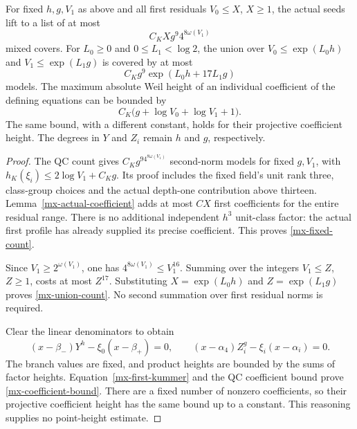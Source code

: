 \begin{theorem}\label{mx-count-height}
For fixed $h,g,V_1$ as above and all first residuals $V_0\le X$,
$X\ge1$, the actual seeds lift to a list of at most
\begin{equation}\label{mx-fixed-count}
 C_KXg^9 4^{8\omega(V_1)}
\end{equation}
mixed covers. For $L_0\ge0$ and $0\le L_1<\log2$, the union over
$V_0\le\exp(L_0h)$ and $V_1\le\exp(L_1g)$ is covered by at most
\begin{equation}\label{mx-union-count}
 C_Kg^9\exp(L_0h+17L_1g)
\end{equation}
models. The maximum absolute Weil height of an individual
coefficient of the defining equations can be bounded by
\begin{equation}\label{mx-coefficient-bound}
 C_K\bigl(g+\log V_0+\log V_1+1\bigr).
\end{equation}
The same bound, with a different constant, holds for their
projective coefficient height. The degrees in $Y$ and $Z_i$
remain $h$ and $g$, respectively.
\end{theorem}
\begin{proof}
The QC count gives $C_Kg^94^{8\omega(V_1)}$ second-norm
models for fixed $g,V_1$, with
$h_K(\xi_i)\le2\log V_1+C_Kg$. Its proof includes the fixed
field's unit rank three, class-group choices and the actual
depth-one contribution above thirteen. Lemma~\ref{mx-actual-coefficient}
adds at most $CX$ first coefficients for the entire residual range.
There is no additional independent $h^3$ unit-class factor:
the actual first profile has already supplied its precise
coefficient. This proves \eqref{mx-fixed-count}.

Since $V_1\ge2^{\omega(V_1)}$, one has
$4^{8\omega(V_1)}\le V_1^{16}$. Summing over the integers
$V_1\le Z$, $Z\ge1$, costs at most $Z^{17}$. Substituting
$X=\exp(L_0h)$ and $Z=\exp(L_1g)$ proves
\eqref{mx-union-count}. No second summation over first residual
norms is required.

Clear the linear denominators to obtain
\[
 (x-\beta_-)Y^h-\xi_0(x-\beta_+)=0,
 \qquad
 (x-\alpha_4)Z_i^g-\xi_i(x-\alpha_i)=0.
\]
The branch values are fixed, and product heights are bounded by
the sums of factor heights. Equation~\eqref{mx-first-kummer}
and the QC coefficient bound prove
\eqref{mx-coefficient-bound}. There are a fixed number of
nonzero coefficients, so their projective coefficient height
has the same bound up to a constant. This reasoning supplies
no point-height estimate.
\end{proof}

